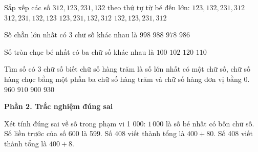 \begin{ex} %
Sắp xếp các số $312, 123, 231, 132$ theo thứ tự từ bé đến lớn:
\choice
{\True $123, 132, 231, 312$}
{$312, 231, 132, 123$}
{$123, 231, 132, 312$}
{$132, 123, 231, 312$}
\end{ex}

\begin{ex} %
Số chẵn lớn nhất có 3 chữ số khác nhau là
\choice
{$998$}
{$988$}
{$978$}
{\True $986$}
\end{ex}

\begin{ex} %
Số tròn chục bé nhất có ba chữ số khác nhau là
\choice
{$100$}
{$102$}
{\True $120$}
{$110$}
\end{ex}

\begin{ex} %
Tìm số có 3 chữ số biết chữ số hàng trăm là số lớn nhất có một chữ số, chữ số hàng chục bằng một phần ba chữ số hàng trăm và chữ số hàng đơn vị bằng 0.
\choice
{$960$}
{$910$}
{$900$}
{\True $930$}
\end{ex}

\textbf{Phần 2. Trắc nghiệm đúng sai}

\begin{ex} %
Xét tính đúng sai về số trong phạm vi 1 000:
\choiceTF
{\True $1\,000$ là số bé nhất có bốn chữ số.}
{\True Số liền trước của số 600 là 599.}
{Số 408 viết thành tổng là $400 + 80$.}
{\True Số 408 viết thành tổng là $400 + 8$.}
\end{ex}


